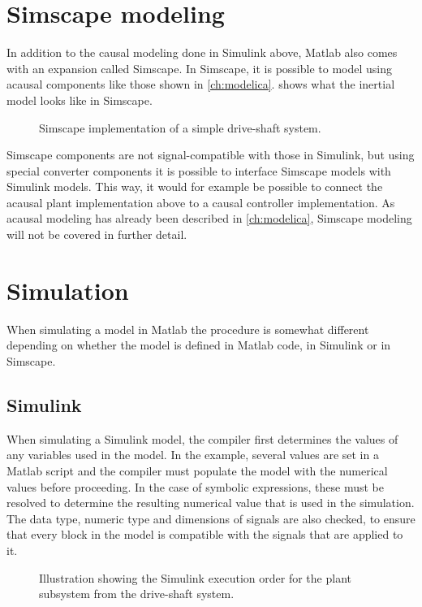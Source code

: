 \documentclass[\rootfolder/main.tex]{subfiles}
\begin{document}
\section{Simscape modeling}

In addition to the causal modeling done in Simulink above, Matlab also comes with an expansion called Simscape.
In Simscape, it is possible to model using acausal components like those shown in \cref{ch:modelica}.
 shows what the inertial model looks like in Simscape.

\begin{figure}[ht]
    \caption{Simscape implementation of a simple drive-shaft system.\label{fig:simscape-inertial}}
\end{figure}

Simscape components are not signal-compatible with those in Simulink, but using special converter components it is possible to interface Simscape models with Simulink models.
This way, it would for example be possible to connect the acausal plant implementation above to a causal controller implementation.
As acausal modeling has already been described in \cref{ch:modelica}, Simscape modeling will not be covered in further detail.

\section{Simulation}

When simulating a model in Matlab the procedure is somewhat different depending on whether the model is defined in Matlab code, in Simulink or in Simscape.

\subsection{Simulink}

When simulating a Simulink model, the compiler first determines the values of any variables used in the model.
In the example, several values are set in a Matlab script and the compiler must populate the model with the numerical values before proceeding.
In the case of symbolic expressions, these must be resolved to determine the resulting numerical value that is used in the simulation.
The data type, numeric type and dimensions of signals are also checked, to ensure that every block in the model is compatible with the signals that are applied to it.

\begin{figure}[ht]
    \caption{Illustration showing the Simulink execution order for the plant subsystem from the drive-shaft system.\label{fig:simulink-inertial-order}}
\end{figure}
\end{document}
